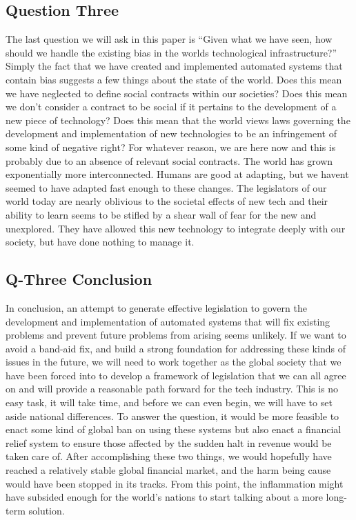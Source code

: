 \documentclass[sigconf, 10pt]{acmart}
\begin{document}
\subsection{Question Three}
The last question we will ask in this paper is “Given what we have seen, how should we handle the existing bias in the worlds technological infrastructure?” Simply the fact that we have created and implemented automated systems that contain bias suggests a few things about the state of the world. Does this mean we have neglected to define social contracts within our societies? Does this mean we don’t consider a contract to be social if it pertains to the development of a new piece of technology? Does this mean that the world views laws governing the development and implementation of new technologies to be an infringement of some kind of negative right? For whatever reason, we are here now and this is probably due to an absence of relevant social contracts. The world has grown exponentially more interconnected. Humans are good at adapting, but we havent seemed to have adapted fast enough to these changes. The legislators of our world today are nearly oblivious to the societal effects of new tech and their ability to learn seems to be stifled by a shear wall of fear for the new and unexplored. They have allowed this new technology to integrate deeply with our society, but have done nothing to manage it.
\subsection{Q-Three Conclusion}
In conclusion, an attempt to generate effective legislation to govern the development and implementation of automated systems that will fix existing problems and prevent future problems from arising seems unlikely. If we want to avoid a band-aid fix, and build a strong foundation for addressing these kinds of issues in the future, we will need to work together as the global society that we have been forced into to develop a framework of legislation that we can all agree on and will provide a reasonable path forward for the tech industry. This is no easy task, it will take time, and before we can even begin, we will have to set aside national differences. To answer the question, it would be more feasible to enact some kind of global ban on using these systems but also enact a financial relief system to ensure those affected by the sudden halt in revenue would be taken care of. After accomplishing these two things, we would hopefully have reached a relatively stable global financial market, and the harm being cause would have been stopped in its tracks. From this point, the inflammation might have subsided enough for the world’s nations to start talking about a more long-term solution.
\end{document}
